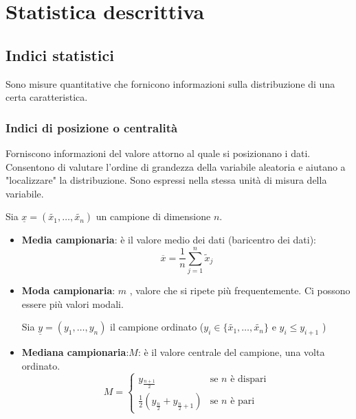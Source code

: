 \documentclass[a4paper]{article}
\theoremstyle{break}
\theoremstyle{break}
\theoremstyle{break}
\theoremstyle{break}
\begin{document}
\section{Statistica descrittiva}
\subsection{Indici statistici}
Sono misure quantitative che fornicono informazioni sulla distribuzione di una certa
caratteristica.
\subsubsection{Indici di posizione o centralità}
Forniscono informazioni del valore attorno al quale si posizionano i dati. Consentono
di valutare l'ordine di grandezza della variabile aleatoria e aiutano a "localizzare"
la distribuzione. Sono espressi nella stessa unità di misura della variabile.

\vspace{1em}
\noindent Sia \( \underline{x} = (\tilde{x_1}, \ldots, \tilde{x_n}) \) un campione di dimensione \( n \).
\begin{itemize}
	\item \textbf{Media campionaria}: è il valore medio dei dati (baricentro dei dati):
	      \[
		      \overline{x} = \frac{1}{n} \sum_{j=1}^{n} \tilde{x}_j
	      \]
	\item \textbf{Moda campionaria}: \( m \) , valore che si ripete più frequentemente. Ci possono
	      essere più valori modali.

	      \vspace{1em}
	      \noindent Sia \( \underline{y} = (y_1, \ldots, y_n) \) il campione
	      ordinato (\( y_i \in \{\tilde{x_1}, \ldots, \tilde{x_n}\}  \) e \( y_i \le y_{i+1} \) )
	\item \textbf{Mediana campionaria}:\( M \): è il valore centrale del campione, una
	      volta ordinato.
	      \[
		      M = \begin{cases}
			      y_{\frac{n+1}{2}}                                & \text{se } n \text{ è dispari} \\
			      \frac{1}{2}(y_{\frac{n}{2}} + y_{\frac{n}{2}+1}) & \text{se } n \text{ è pari}
		      \end{cases}
	      \]
\end{itemize}
\end{document}
